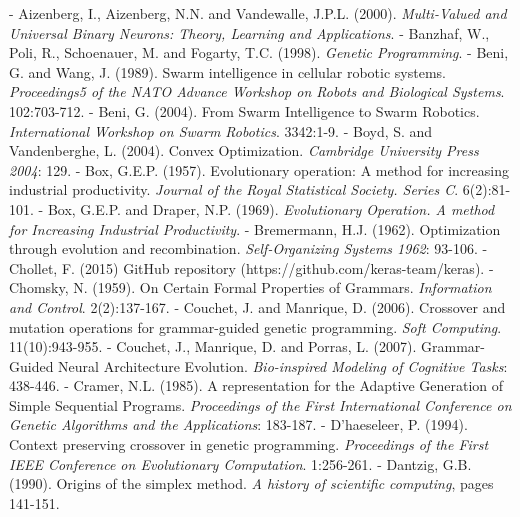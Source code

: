\documentclass[spanish,a4paper,12pt,twoside]{report}
\begin{document}
  \begin{thebibliography}{00}
  \vspace{-1cm}
  \makeatletter
  \def\@biblabel#1{}
  \let\old@bibitem\bibitem
  \def\bibitem#1{\old@bibitem{#1}\leavevmode\kern-\bibindent}
  \makeatother
  
   Aizenberg, I., Aizenberg, N.N. and Vandewalle, J.P.L. (2000). \emph{Multi-Valued and Universal Binary Neurons: Theory, Learning and Applications}.
   Banzhaf, W., Poli, R., Schoenauer, M. and Fogarty, T.C. (1998). \emph{Genetic Programming}.
   Beni, G. and Wang, J. (1989). Swarm intelligence in cellular robotic systems. \emph{Proceedings5 of the NATO Advance Workshop on Robots and Biological Systems}. 102:703-712.
   Beni, G. (2004). From Swarm Intelligence to Swarm Robotics. \emph{International Workshop on Swarm Robotics}. 3342:1-9.
   Boyd, S. and Vandenberghe, L. (2004). Convex Optimization. \emph{Cambridge University Press 2004}: 129.
   Box, G.E.P. (1957). Evolutionary operation: A method for increasing industrial productivity. \emph{Journal of the Royal Statistical Society. Series C}. 6(2):81-101.
   Box, G.E.P. and Draper, N.P. (1969). \emph{Evolutionary Operation. A method for Increasing Industrial Productivity}.
   Bremermann, H.J. (1962). Optimization through evolution and recombination. \emph{Self-Organizing Systems 1962}: 93-106.
   Chollet, F. (2015) GitHub repository (https://github.com/keras-team/keras).
   Chomsky, N. (1959). On Certain Formal Properties of Grammars. \emph{Information and Control}. 2(2):137-167.
   Couchet, J. and Manrique, D. (2006). Crossover and mutation operations for grammar-guided genetic programming. \emph{Soft Computing}. 11(10):943-955.
   Couchet, J., Manrique, D. and Porras, L. (2007). Grammar-Guided Neural Architecture Evolution. \emph{Bio-inspired Modeling of Cognitive Tasks}: 438-446.
   Cramer, N.L. (1985). A representation for the Adaptive Generation of Simple Sequential Programs. \emph{Proceedings of the First International Conference on Genetic Algorithms and the Applications}: 183-187.
   D'haeseleer, P. (1994). Context preserving crossover in genetic programming. \emph{Proceedings of the First IEEE Conference on Evolutionary Computation}. 1:256-261.
   Dantzig, G.B. (1990). Origins of the simplex method. \emph{A history of scientific computing}, pages 141-151.

\end{thebibliography}
\end{document}
